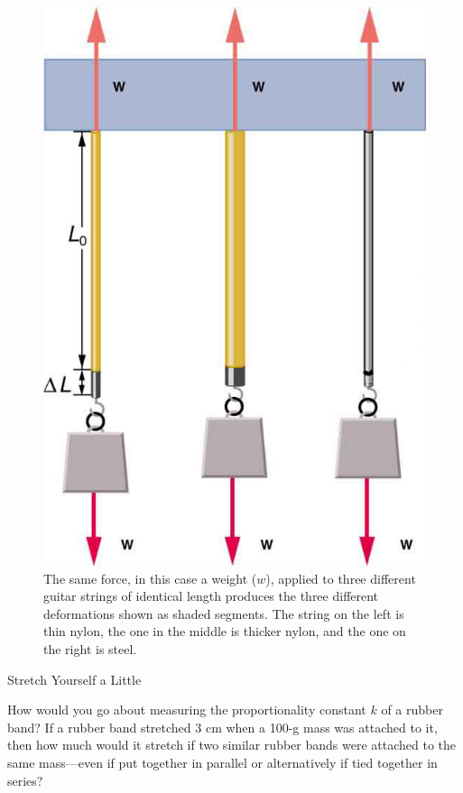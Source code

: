 \documentclass[
]{book}
\begin{document}
\begin{figure}
\hypertarget{import-auto-id1165296232089}{%
\centering
\includegraphics{images/Figure_06_03_02a.jpg}
\caption{The same force, in this case a weight (\(w{}\)), applied to three
different guitar strings of identical length produces the three
different deformations shown as shaded segments. The string on the left
is thin nylon, the one in the middle is thicker nylon, and the one on
the right is
steel.}\label{import-auto-id1165296232089}
}
\end{figure}

\hypertarget{fs-id1165298669085}{}
Stretch Yourself a Little

How would you go about measuring the proportionality constant \(k{}\) of a
rubber band? If a rubber band stretched 3 cm when a 100-g mass was
attached to it, then how much would it stretch if two similar rubber
bands were attached to the same mass---even if put together in parallel
or alternatively if tied together in series?
\end{document}
